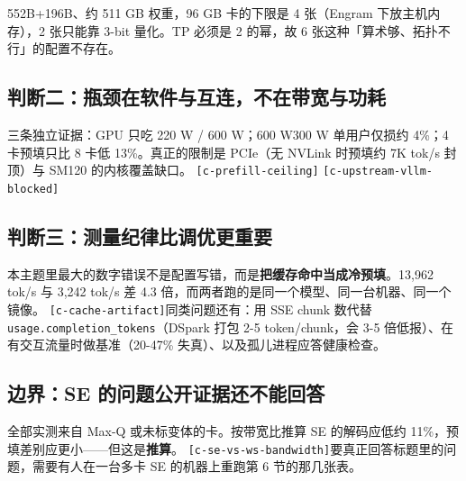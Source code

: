 552B+196B、约 511 GB 权重，96 GB 卡的下限是 4 张（Engram 下放主机内存），2 张只能靠 3-bit 量化。TP 必须是 2 的幂，故 6 张这种「算术够、拓扑不行」的配置不存在。


\subsection{判断二：瓶颈在软件与互连，不在带宽与功耗}

三条独立证据：GPU 只吃 220 W / 600 W；600 W300 W 单用户仅损约 4\%；4 卡预填只比 8 卡低 13\%。真正的限制是 PCIe（无 NVLink 时预填约 7K tok/s 封顶）与 SM120 的内核覆盖缺口。 {\scriptsize\texttt{[c-\hspace{0pt}prefill-\hspace{0pt}ceiling]}} {\scriptsize\texttt{[c-\hspace{0pt}upstream-\hspace{0pt}vllm-\hspace{0pt}blocked]}}


\subsection{判断三：测量纪律比调优更重要}

本主题里最大的数字错误不是配置写错，而是\textbf{把缓存命中当成冷预填}。13,962 tok/s 与 3,242 tok/s 差 4.3 倍，而两者跑的是同一个模型、同一台机器、同一个镜像。 {\scriptsize\texttt{[c-\hspace{0pt}cache-\hspace{0pt}artifact]}}同类问题还有：用 SSE chunk 数代替 \texttt{usage.completion\_tokens}（DSpark 打包 2-\hspace{0pt}5 token/chunk，会 3-\hspace{0pt}5 倍低报）、在有交互流量时做基准（20-\hspace{0pt}47\% 失真）、以及孤儿进程应答健康检查。


\subsection{边界：SE 的问题公开证据还不能回答}

全部实测来自 Max-Q 或未标变体的卡。按带宽比推算 SE 的解码应低约 11\%，预填差别应更小——但这是\textbf{推算}。 {\scriptsize\texttt{[c-\hspace{0pt}se-\hspace{0pt}vs-\hspace{0pt}ws-\hspace{0pt}bandwidth]}}要真正回答标题里的问题，需要有人在一台多卡 SE 的机器上重跑第 6 节的那几张表。


